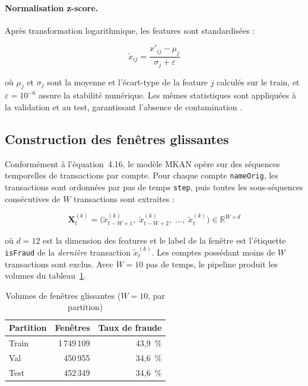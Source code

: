 \documentclass[11pt,a4paper,oneside]{report}
\theoremstyle{definition}
\theoremstyle{remark}
\begin{document}
\paragraph{Normalisation z-score.}
Après transformation logarithmique, les features sont standardisées :

\begin{equation}
    \tilde{x}_{ij} = \frac{x'_{ij} - \mu_j}{\sigma_j + \varepsilon}
    \label{eq:zscore_impl}
\end{equation}

où $\mu_j$ et $\sigma_j$ sont la moyenne et l'écart-type de la feature $j$ calculés sur le train, et $\varepsilon = 10^{-6}$ assure la stabilité numérique. Les mêmes statistiques sont appliquées à la validation et au test, garantissant l'absence de contamination \citep{Li2024}.

\subsection{Construction des fenêtres glissantes}
\label{subsec:windows}

Conformément à l'équation~4.16, le modèle MKAN opère sur des séquences temporelles de transactions par compte. Pour chaque compte \texttt{nameOrig}, les transactions sont ordonnées par pas de temps \texttt{step}, puis toutes les sous-séquences consécutives de $W$ transactions sont extraites :

\begin{equation}
    \mathbf{X}^{(k)}_t = \bigl(\tilde{x}_{t-W+1}^{(k)},\; \tilde{x}_{t-W+2}^{(k)},\; \ldots,\; \tilde{x}_t^{(k)}\bigr) \in \mathbb{R}^{W \times d}
    \label{eq:window_impl}
\end{equation}

où $d = 12$ est la dimension des features et le label de la fenêtre est l'étiquette \texttt{isFraud} de la \textit{dernière} transaction $\tilde{x}_t^{(k)}$. Les comptes possédant moins de $W$ transactions sont exclus. Avec $W = 10$ pas de temps, le pipeline produit les volumes du tableau~\ref{tab:windows}.

\begin{table}[h!]
\centering
\caption{Volumes de fenêtres glissantes ($W = 10$, par partition)}
\label{tab:windows}
\begin{tabular}{lrr}
\hline
\textbf{Partition} & \textbf{Fenêtres} & \textbf{Taux de fraude} \\
\hline
Train & 1\,749\,109 & 43{,}9~\% \\
Val   &   450\,955  & 34{,}6~\% \\
Test  &   452\,349  & 34{,}6~\% \\
\hline
\end{tabular}
\end{table}
\end{document}
